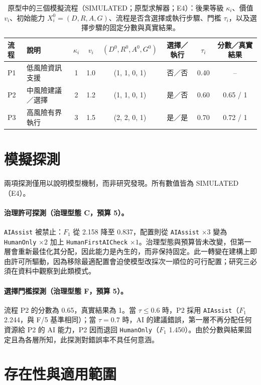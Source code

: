\begin{table}[tbp]
\centering
\caption{原型中的三個模擬流程（SIMULATED；原型求解器；E4）：後果等級 $\kappa_i$、價值 $v_i$、初始能力 $X_i^0=(D,R,A,G)$、流程是否含選擇或執行步驟、門檻 $\tau_i$，以及選擇步驟的固定分數與真實結果。}
\label{zh:tab:app_processes}
\footnotesize
\setlength{\tabcolsep}{4pt}
\begin{tabular}{lp{3.4cm}cccccc}
\toprule
流程 & 說明 & $\kappa_i$ & $v_i$ & $(D^0,R^0,A^0,G^0)$ & 選擇／執行 & $\tau_i$ & 分數／真實結果 \\
\midrule
P1 & 低風險資訊支援 & 1 & 1.0 & (1, 1, 0, 1) & 否／否 & 0.40 & -- \\
P2 & 中風險建議／選擇 & 2 & 1.2 & (1, 1, 0, 1) & 是／否 & 0.60 & 0.65 / 1 \\
P3 & 高風險有界執行 & 3 & 1.5 & (2, 2, 0, 1) & 是／是 & 0.70 & 0.72 / 1 \\
\bottomrule
\end{tabular}
\end{table}

\section{模擬探測}
\label{zh:app:mlp_probes}

兩項探測僅用以說明模型機制，而非研究發現。所有數值皆為 SIMULATED（E4）。

\paragraph{治理許可探測（治理型態 C，預算 5）。}\texttt{AIAssist} 被禁止：$F_1$ 從 2.158 降至 0.837，配置則從 \texttt{AIAssist} $\times3$ 變為 \texttt{HumanOnly} $\times2$ 加上 \texttt{HumanFirstAICheck} $\times1$。治理型態與預算皆未改變，但第一層會重新最佳化其分配，因此能力是內生的，而非保持固定。此一轉變在建構上即由許可所驅動，因為移除最適配置會迫使模型改採次一順位的可行配置；研究三必須在資料中觀察到此類模式。

\paragraph{選擇門檻探測（治理型態 F，預算 5）。}流程 P2 的分數為 0.65，真實結果為 1。當 $\tau\leq0.6$ 時，P2 採用 \texttt{AIAssist}（$F_1$ 2.244，與 F/5 基準相同）；當 $\tau=0.7$ 時，AI 的建議錯誤，第一層不再分配任何資源給 P2 的 AI 能力，P2 因而退回 \texttt{HumanOnly}（$F_1$ 1.450）。由於分數與結果固定且為各層所知，此探測對錯誤率不具任何意涵。

\section{存在性與適用範圍}

